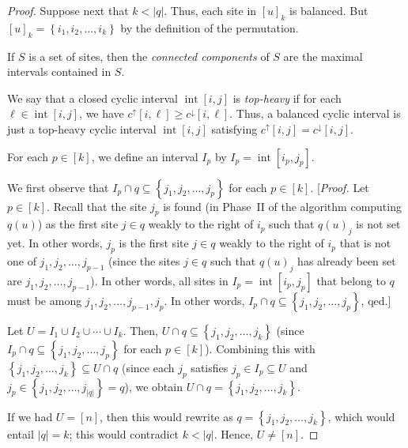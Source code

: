 \documentclass[reqno]{amsart}
\newcommand{\0}{\phantom{c}}
\DeclareMathOperator{\inter}{int} %
\newenvironment{verlong}{}{}
\newcommand{\set}[1]{\left\{ #1 \right\}}
\newcommand{\abs}[1]{\left| #1 \right|}
\newcommand{\ive}[1]{\left[ #1 \right]}
\newcommand{\defn}[1]{{\color{darkred}\emph{#1}}} %
\theoremstyle{plain}
\theoremstyle{definition}
\numberwithin{equation}{section}
\begin{document}
\begin{verlong}
\begin{proof}
Suppose next that $k < \abs{q}$.
Thus, each site in $[u]_k$ is balanced.
But $[u]_k = \set{i_1, i_2, \ldots, i_k}$ by the definition of the permutation.

If $S$ is a set of sites, then the \defn{connected components} of $S$ are the maximal intervals contained in $S$.

We say that a closed cyclic interval $\inter[i,j]$ is \defn{top-heavy} if for each $\ell \in \inter[i,j]$, we have $c^\uparrow[i,\ell] \geq c^\downarrow[i,\ell]$.
Thus, a balanced cyclic interval is just a top-heavy cyclic interval $\inter[i,j]$ satisfying $c^{\uparrow}[i,j] = c^{\downarrow}[i,j]$.

For each $p \in \ive{k}$, we define an interval $I_p$ by $I_p = \inter[i_p, j_p]$.

We first observe that $I_p \cap q \subseteq \set{j_1, j_2, \ldots, j_p}$
for each $p \in \ive{k}$.
[\textit{Proof.} Let $p \in \ive{k}$.
Recall that the site $j_p$ is found
(in Phase~II of the algorithm computing $q(u)$) as the first site $j \in q$ weakly to the right of $i_p$ such that $q(u)_j$ is not set yet.
In other words, $j_p$ is the first site $j \in q$ weakly to the right of $i_p$ that is not one of $j_1, j_2, \ldots, j_{p-1}$
(since the sites $j \in q$ such that $q(u)_j$ has already been set are $j_1, j_2, \ldots, j_{p-1}$).
In other words, all sites in $I_p = \inter[i_p, j_p]$ that belong to $q$ must be among $j_1, j_2, \ldots, j_{p-1}, j_p$.
In other words, $I_p \cap q \subseteq \set{j_1, j_2, \ldots, j_p}$, qed.]

Let $U = I_1 \cup I_2 \cup \cdots \cup I_k$.
Then, $U \cap q \subseteq \set{j_1, j_2, \ldots, j_k}$ (since $I_p \cap q \subseteq \set{j_1, j_2, \ldots, j_p}$ for each $p \in \ive{k}$).
Combining this with $\set{j_1, j_2, \ldots, j_k} \subseteq U \cap q$ (since each $j_p$ satisfies $j_p \in I_p \subseteq U$ and $j_p \in \set{j_1, j_2, \ldots, j_{\abs{q}}} = q$),
we obtain $U \cap q = \set{j_1, j_2, \ldots, j_k}$.

If we had $U = \ive{n}$, then this would rewrite as $q = \set{j_1, j_2, \ldots, j_k}$, which would entail $\abs{q} = k$; this would contradict $k < \abs{q}$.
Hence, $U \neq \ive{n}$.


\end{proof}
\end{verlong}
\end{document}
